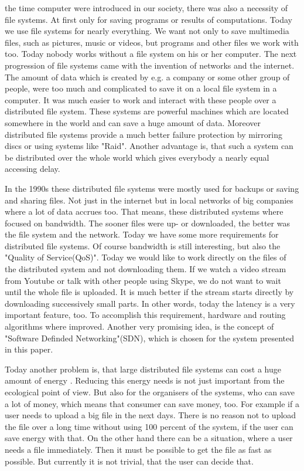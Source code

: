  the time computer were introduced in our society, there was also a necessity of file systems. At first only for saving programs or results of computations. Today we use file systems for nearly everything. We want not only to save multimedia files, such as pictures, music or videos, but programs and other files we work with too. Today nobody works without a file system on his or her  computer. The next progression of file systems came with the invention of networks and the internet. The amount of data which is created by e.g. a company or some other group of people, were too much and complicated to save it on a local file system in a computer. It was much easier to work and interact with these people over a distributed file system. These systems are powerful machines which are located somewhere in the world and can save a huge amount of data. Moreover distributed file systems provide a much better failure protection by mirroring discs or using systems like "Raid". Another advantage is, that such a system can be distributed over the whole world which gives everybody a nearly equal accessing delay. 

In the 1990s these distributed file systems were mostly used for backups or saving and sharing files. Not just in the internet but in local networks of big companies where a lot of data accrues too. That means, these distributed systems where focused on bandwidth. The sooner files were up- or downloaded, the better was the file system and the network. Today we have some more requirements for distributed file systems. Of course bandwidth is still interesting, but also the "Quality of Service(QoS)". Today we would like to work directly on the files of the distributed system and not downloading them. If we watch a video stream from Youtube or talk with other people using Skype, we do not want to wait until the whole file is uploaded. It is much better if the stream starts directly by downloading successively small parts. In other words, today the latency is a very important feature, too. To accomplish this requirement, hardware and routing algorithms where improved. Another very promising idea, is the concept of "Software Definded Networking"(SDN), which is chosen for the system presented in this paper.

Today another problem is, that large distributed file systems can cost a huge amount of energy . Reducing this energy needs is not just important from the ecological point of view. But also for the organisers of the systems, who can save a lot of money, which means that consumer can save money, too. For example if a user needs to upload a big file in the next days. There is no reason not to upload the file over a long time without using 100 percent of the system, if the user can save energy with that. On the other hand there can be a situation, where a user needs a file immediately. Then it must be possible to get the file as fast as possible. But currently it is not trivial, that the user can decide that.  

